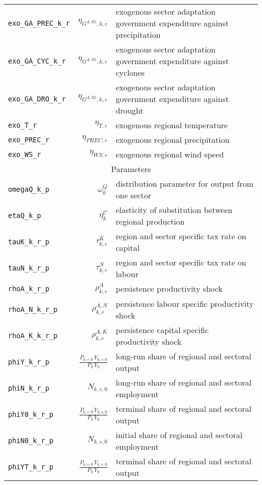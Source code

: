 \begin{center}
\begin{longtable}{lrl}
\texttt{exo\_GA\_PREC\_k\_r} & ${\eta_{G^{A,SL},k,r}}$ & exogenous sector adaptation government expenditure against precipitation\\
\texttt{exo\_GA\_CYC\_k\_r} & ${\eta_{G^{A,SL},k,r}}$ & exogenous sector adaptation government expenditure against cyclones\\
\texttt{exo\_GA\_DRO\_k\_r} & ${\eta_{G^{A,SL},k,r}}$ & exogenous sector adaptation government expenditure against drought\\
\texttt{exo\_T\_r} & ${\eta_{T,r}}$ & exogenous regional temperature\\
\texttt{exo\_PREC\_r} & ${\eta_{PREC,r}}$ & exogenous regional precipitation\\
\texttt{exo\_WS\_r} & ${\eta_{WS,r}}$ & exogenous regional wind speed\\
\hline%
\multicolumn{3}{c}{Parameters}\\%
\hline%
\texttt{omegaQ\_k\_p} & ${\omega^{Q}_{k}}$ & distribution parameter for output from one sector\\
\texttt{etaQ\_k\_p} & ${\eta^{C}_{k}}$ & elasticity of substitution between regional production\\
\texttt{tauK\_k\_r\_p} & ${\tau^{K}_{k,r}}$ & region and sector specific tax rate on capital\\
\texttt{tauN\_k\_r\_p} & ${\tau^{N}_{k,r}}$ & region and sector specific tax rate on labour\\
\texttt{rhoA\_k\_r\_p} & ${\rho^{A}_{k,r}}$ & persistence productivity shock\\
\texttt{rhoA\_N\_k\_r\_p} & ${\rho^{A,N}_{k,r}}$ & persistence labour specific productivity shock\\
\texttt{rhoA\_K\_k\_r\_p} & ${\rho^{A,K}_{k,r}}$ & persistence capital specific productivity shock\\
\texttt{phiY\_k\_r\_p} & $\frac{P_{k,r,0} \, Y_{k,r,0}}{P_{0} \, Y_{0}}$ & long-run share of regional and sectoral output\\
\texttt{phiN\_k\_r\_p} & ${N_{k,r,0}}$ & long-run share of regional and sectoral employment\\
\texttt{phiY0\_k\_r\_p} & $\frac{P_{k,r,0} \, Y_{k,r,0}}{P_{0} \, Y_{0}}$ & terminal share of regional and sectoral output\\
\texttt{phiN0\_k\_r\_p} & ${N_{k,r,0}}$ & initial share of regional and sectoral employment\\
\texttt{phiYT\_k\_r\_p} & $\frac{P_{k,r,0} \, Y_{k,r,0}}{P_{0} \, Y_{0}}$ & terminal share of regional and sectoral output\\

\end{longtable}
\end{center}
